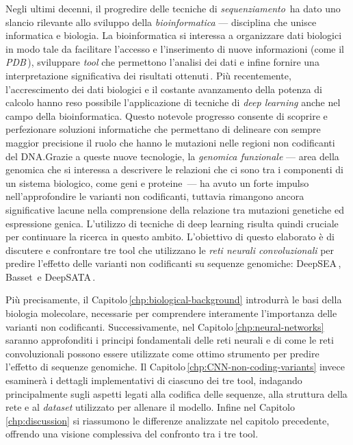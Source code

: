 Negli ultimi decenni, il progredire delle tecniche di \textsl{sequenziamento}\,\cite{pareek2011sequencing} ha dato uno slancio rilevante allo sviluppo della \textsl{bioinformatica} — disciplina che unisce informatica e biologia. La bioinformatica si interessa a organizzare dati biologici in modo tale da facilitare l'accesso e l'inserimento di nuove informazioni (come il \textsl{PDB}\,\cite{burley2017protein}), sviluppare \textsl{tool} che permettono l'analisi dei dati e infine fornire una interpretazione significativa dei risultati ottenuti\,\cite{luscombe2001bioinformatics}. Più recentemente, l'accrescimento dei dati biologici e il costante avanzamento della potenza di calcolo hanno reso possibile l'applicazione di tecniche di \textsl{deep learning} anche nel campo della bioinformatica. Questo notevole progresso consente di scoprire e perfezionare soluzioni informatiche che permettano di delineare con sempre maggior precisione il ruolo che hanno le mutazioni nelle regioni non codificanti del DNA.\@ Grazie a queste nuove tecnologie, la \textsl{genomica funzionale} — area della genomica che si interessa a descrivere le relazioni che ci sono tra i componenti di un sistema biologico, come geni e proteine\,\cite{caudai2021ai} — ha avuto un forte impulso nell'approfondire le varianti non codificanti, tuttavia rimangono ancora significative lacune nella comprensione della relazione tra mutazioni genetiche ed espressione genica. L'utilizzo di tecniche di deep learning risulta quindi cruciale per continuare la ricerca in questo ambito. L'obiettivo di questo elaborato è di discutere e confrontare tre tool che utilizzano le \textsl{reti neurali convoluzionali} per predire l'effetto delle varianti non codificanti su sequenze genomiche: DeepSEA\,\cite{zhou2015predicting}, Basset\,\cite{kelley2016basset} e DeepSATA\,\cite{ma2023deepsata}.

Più precisamente, il Capitolo\,\ref{chp:biological-background} introdurrà le basi della biologia molecolare, necessarie per comprendere interamente l'importanza delle varianti non codificanti. Successivamente, nel Capitolo\,\ref{chp:neural-networks} saranno approfonditi i principi fondamentali delle reti neurali e di come le reti convoluzionali possono essere utilizzate come ottimo strumento per predire l'effetto di sequenze genomiche. Il Capitolo\,\ref{chp:CNN-non-coding-variants} invece esaminerà i dettagli implementativi di ciascuno dei tre tool, indagando principalmente sugli aspetti legati alla codifica delle sequenze, alla struttura della rete e al \textsl{dataset} utilizzato per allenare il modello. Infine nel Capitolo\,\ref{chp:discussion} si riassumono le differenze analizzate nel capitolo precedente, offrendo una visione complessiva del confronto tra i tre tool.


